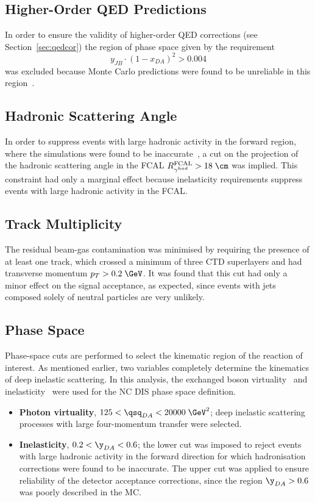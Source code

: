 \subsection{Higher-Order QED Predictions}
\label{subsec:qedcorcut}
In order to ensure the validity of higher-order QED corrections (see Section~\ref{sec:qedcor}) the region of phase space given by the requirement 
\begin{equation}
y_{JB}\cdot\left(1-x_{DA}\right)^2>0.004
\end{equation}
was excluded because Monte Carlo predictions were found to be unreliable in this region~\cite{cpc:81:381}.

\subsection{Hadronic Scattering Angle}
\label{subsec:gammahadcut}
In order to suppress events with large hadronic activity in the forward region, where the simulations were found to be inaccurate~\cite{thesis:jose:2003}, a cut on the projection of the hadronic scattering angle in the FCAL $R^\text{FCAL}_{\gamma^{had}} > 18\;\cm$ was implied. This constraint had only a marginal effect because inelasticity requirements suppress events with large hadronic activity in the FCAL.

\subsection{Track Multiplicity}
\label{subsec:trackmultcut}
The residual beam-gas contamination was minimised by requiring the presence of at least one track, which crossed a minimum of three CTD superlayers and had transverse momentum $p_T>0.2\;\GeV$. It was found that this cut had only a minor effect on the signal acceptance, as expected, since events with jets composed solely of neutral particles are very unlikely.

\subsection{Phase Space}
\label{subsec:phasespace}
Phase-space cuts are performed to select the kinematic region of the reaction of interest. As mentioned earlier, two variables completely determine the kinematics of deep inelastic scattering. In this analysis, the exchanged boson virtuality \qsq~and inelasticity \y~were used for the NC DIS phase space definition.
\begin{itemize}
	\item \textbf{Photon virtuality}, $125 < \qsq_{DA} < 20000\;\GeV^2$;  deep inelastic scattering processes with large four-momentum transfer were selected.
	\item \textbf{Inelasticity}, $0.2 < \y_{DA} < 0.6$; the lower cut was imposed to reject events with large hadronic activity in the forward direction for which hadronisation corrections were found to be inaccurate. The upper cut was applied to ensure reliability of the detector acceptance corrections, since the region $\y_{DA} > 0.6$ was poorly described in the MC.
\end{itemize}


